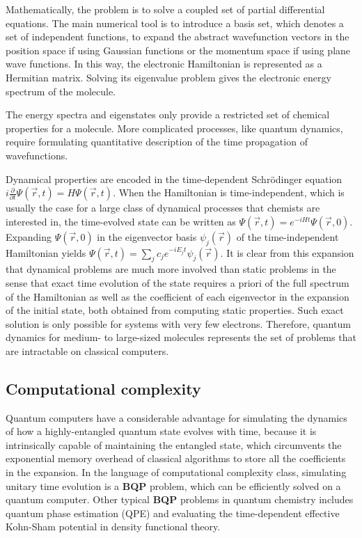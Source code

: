 \documentclass[journal=jctcce,manuscript=article]{achemso}
\begin{document}
Mathematically, the problem is to solve a coupled set of partial differential equations. The main numerical tool is to introduce a basis set, which denotes a set of independent functions, to expand the abstract wavefunction vectors in the position space if using Gaussian functions or the momentum space if using plane wave functions.\cite{helgaker2014molecular} In this way, the electronic Hamiltonian is represented as a Hermitian matrix. Solving its eigenvalue problem gives the electronic energy spectrum of the molecule.

The energy spectra and eigenstates only provide a restricted set of chemical properties for a molecule. More complicated processes, like quantum dynamics, require formulating quantitative description of the time propagation of wavefunctions. 

Dynamical properties are encoded in the time-dependent Schr\"{o}dinger equation $i \frac{\partial}{\partial t} \Psi(\vec{r}, t)=H \Psi(\vec{r}, t)$. When the Hamiltonian is time-independent, which is usually the case for a large class of dynamical processes that chemists are interested in, the time-evolved state can be written as $\Psi(\vec{r}, t)=e^{-i H t} \Psi(\vec{r}, 0)$. Expanding $\Psi(\vec{r}, 0)$ in the eigenvector basis $\psi_{j}(\vec{r})$ of the time-independent Hamiltonian yields $\Psi(\vec{r}, t)=\sum_{j} c_{j} e^{-i E_{j} t} \psi_{j}(\vec{r})$. It is clear from this expansion that dynamical problems are much more involved than static problems in the sense that exact time evolution of the state requires a priori of the full spectrum of the Hamiltonian as well as the coefficient of each eigenvector in the expansion of the initial state, both obtained from computing static properties. Such exact solution is only possible for systems with very few electrons. Therefore, quantum dynamics for medium- to large-sized molecules represents the set of problems that are intractable on classical computers.

\subsection{Computational complexity}
Quantum computers have a considerable advantage for simulating the dynamics of how a highly-entangled quantum state evolves with time, because it is intrinsically capable of maintaining the entangled state, which circumvents the exponential memory overhead of classical algorithms to store all the coefficients in the expansion. In the language of computational complexity class, simulating unitary time evolution is a \textbf{BQP} problem,\cite{Kassal:2008bf} which can be efficiently solved on a quantum computer. Other typical \textbf{BQP} problems in quantum chemistry includes quantum phase estimation (QPE)\cite{wocjan2006natural} and evaluating the time-dependent effective Kohn-Sham potential in density functional theory.\cite{whitfield2014computational}
\end{document}
